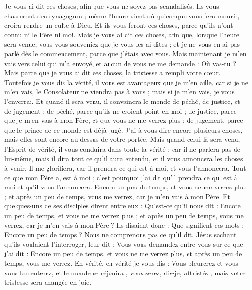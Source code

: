 \begin{multicols}{2}
\VerseOne{}Je vous ai dit ces choses, afin que vous ne soyez pas scandalisés.
Ils vous chasseront des synagogues ; même l'heure vient où quiconque vous fera mourir, croira rendre un culte à Dieu.
Et ils vous feront ces choses, parce qu'ils n'ont connu ni le Père ni moi.
Mais je vous ai dit ces choses, afin que, lorsque l'heure sera venue, vous vous souveniez que je vous les ai dites ; et je ne vous en ai pas parlé dès le commencement, parce que j'étais avec vous.
Mais maintenant je m'en vais vers celui qui m'a envoyé, et aucun de vous ne me demande : Où vas-tu ?
Mais parce que je vous ai dit ces choses, la tristesse a rempli votre cœur.
Toutefois je vous dis la vérité, il vous est avantageux que je m'en aille, car si je ne m'en vais, le Consolateur ne viendra pas à vous ; mais si je m'en vais, je vous l'enverrai.
Et quand il sera venu, il convaincra le monde de péché, de justice, et de jugement :
de péché, parce qu'ils ne croient point en moi ;
de justice, parce que je m'en vais à mon Père, et que vous ne me verrez plus ;
de jugement, parce que le prince de ce monde est déjà jugé.
 J'ai à vous dire encore plusieurs choses, mais elles sont encore au-dessus de votre portée.
Mais quand celui-là sera venu, l'Esprit de vérité, il vous conduira dans toute la vérité ; car il ne parlera pas de lui-même, mais il dira tout ce qu'il aura entendu, et il vous annoncera les choses à venir.
Il me glorifiera, car il prendra ce qui est à moi, et vous l'annoncera.
Tout ce que mon Père a, est à moi ; c'est pourquoi j'ai dit qu'il prendra ce qui est à moi et qu'il vous l'annoncera.
Encore un peu de temps, et vous ne me verrez plus ; et après un peu de temps, vous me verrez, car je m'en vais à mon Père.
Et quelques-uns de ses disciples dirent entre eux : Qu'est-ce qu'il nous dit : Encore un peu de temps, et vous ne me verrez plus ; et après un peu de temps, vous me verrez, car je m'en vais à mon Père ?
Ils disaient donc : Que signifient ces mots : Encore un peu de temps ? Nous ne comprenons pas ce qu'il dit.
Jésus sachant qu'ils voulaient l'interroger, leur dit : Vous vous demandez entre vous sur ce que j'ai dit : Encore un peu de temps, et vous ne me verrez plus, et après un peu de temps, vous me verrez.
En vérité, en vérité je vous dis : Vous pleurerez et vous vous lamenterez, et le monde se réjouira ; vous serez, dis-je, attristés ; mais votre tristesse sera changée en joie.

\end{multicols}
